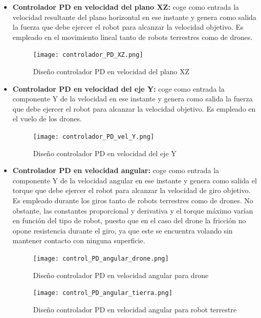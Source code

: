 \begin{itemize}
    \item \textbf{Controlador PD en velocidad del plano XZ:} coge como entrada la velocidad resultante del plano horizontal en ese instante y genera como salida la fuerza que debe ejercer el robot para alcanzar la velocidad objetivo. Es empleado en el movimiento lineal tanto de robots terrestres como de drones.
    
    \begin{figure}[h!]
    \centering
    \texttt{[image: controlador\_PD\_XZ.png]}
    \caption{Diseño controlador PD en velocidad del plano XZ\footnotemark}
    \label{fig:esquema_pd_1}
    \end{figure}
    
    \item \textbf{Controlador PD en velocidad del eje Y:} coge como entrada la componente Y de la velocidad en ese instante y genera como salida la fuerza que debe ejercer el robot para alcanzar la velocidad objetivo. Es empleado en el vuelo de los drones.
    
    \begin{figure}[h!]
    \centering
    \texttt{[image: controlador\_PD\_vel\_Y.png]}
    \caption{Diseño controlador PD en velocidad del eje Y\footnotemark}
    \label{fig:esquema_pd_2}
    \end{figure}
    
    \item \textbf{Controlador PD en velocidad angular:} coge como entrada la componente Y de la velocidad angular en ese instante y genera como salida el torque que debe ejercer el robot para alcanzar la velocidad de giro objetivo. Es empleado durante los giros tanto de robots terrestres como de drones. No obstante, las constantes proporcional y derivativa y el torque máximo varían en función del tipo de robot, puesto que en el caso del drone la fricción no opone resistencia durante el giro, ya que este se encuentra volando sin mantener contacto con ninguna superficie.
    
    \begin{figure}[h!]
    \centering
    \texttt{[image: control\_PD\_angular\_drone.png]}
    \caption{Diseño controlador PD en velocidad angular para drone\footnotemark}
    \label{fig:esquema_pd_3}
    \end{figure}

    \begin{figure}[h!]
    \centering
    \texttt{[image: control\_PD\_angular\_tierra.png]}
    \caption{Diseño controlador PD en velocidad angular para robot terrestre\footnotemark}
    \label{fig:esquema_pd_4}
    \end{figure} 
    

\end{itemize}
